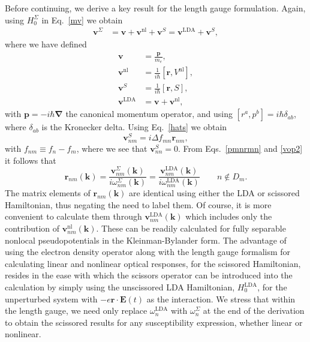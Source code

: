 \documentclass[floatfix,prb,aps,superscriptaddress,showpacs,11pt,preprint,letterpaper]{revtex4}
\begin{document}
Before continuing,
we derive a key result for the length gauge formulation. 
Again, using $H^\Sigma_0$ in
Eq.~\eqref{mv} we obtain
\begin{align}
\mathbf{v}^\Sigma&=
\mathbf{v} 
+
\mathbf{v}^\mathrm{nl} 
+\mathbf{v}^S
=
\mathbf{v}^\mathrm{LDA} 
+\mathbf{v}^S 
,
\label{vop2}
\end{align}
where we have defined 
\begin{align}
\mathbf{v} 
&=\frac{\mathbf{p}}{m_e},
\nonumber\\
\mathbf{v}^\mathrm{nl} 
&=
\frac{1}{i\hbar}[\mathbf{r},V^\mathrm{nl}],\label{vnl}
\\
\mathbf{v}^S
&=
\frac{1}{i\hbar}[\mathbf{r}, S],
\nonumber\\
\mathbf{v}^\mathrm{LDA} 
&=
\mathbf{v} 
+\mathbf{v}^\mathrm{nl}
,\nonumber
\end{align}  
with $\mathbf{p}=-i\hbar\boldsymbol{\nabla}$ the canonical momentum operator, 
and using $[r^a,p^b]=i\hbar\delta_{ab}$, where $\delta_{ab}$ is the Kronecker delta.
Using Eq.~\eqref{hats} we obtain 
\begin{equation}
\mathbf{v}^S_{nm}=i\Delta f_{mn}\mathbf{r}_{nm},
\label{chon.2} 
\end{equation}
with $f_{nm}\equiv f_n-f_m$,
where we see that $\mathbf{v}^S_{nn}=0$. From Eqs.~\eqref{pmnrmn} and
\eqref{vop2}
 it follows that
\begin{equation}
\mathbf{r}_{nm}(\mathbf{k}) 
=
\frac{\mathbf{v}^\Sigma_{nm}(\mathbf{k})}{i\omega^\Sigma_{nm}(\mathbf{k})}
=
\frac{\mathbf{v}^\mathrm{LDA}_{nm}(\mathbf{k})}{i\omega^\mathrm{LDA}_{nm}(\mathbf{k})}
\quad\quad n\notin D_m 
. 
\label{chon.10}
\end{equation}
The matrix elements 
of $\mathbf{r}_{nm}(\mathbf{k})$ are identical using either
the LDA or scissored
Hamiltonian, thus negating the need to label them.
Of course, it is more convenient to calculate them
through $\mathbf{v}^\mathrm{LDA}_{nm}(\mathbf{k})$ which 
includes only the contribution of 
$\mathbf{v}^\mathrm{nl}_{nm}(\mathbf{k})$. These can be readily
calculated
for 
fully separable nonlocal pseudopotentials in the 
Kleinman-Bylander 
form.\cite{olevanoPC,mottaCMS10,kleinmanPRL82,adolphPRB96}
The advantage of using the electron density operator along with 
the length gauge formalism for 
calculating linear and nonlinear optical responses,
for the scissored Hamiltonian,
resides in the ease with which the scissors operator
can be introduced into the calculation
by simply using the unscissored LDA Hamiltonian,
$H_0^{\mathrm{LDA}}$,
for the unperturbed system 
with $-e\mathbf{r}\cdot \mathbf{E}(t)$ as the interaction.
We stress that within the length gauge,
we need only replace $\omega^{\mathrm{LDA}}_{n}$ with 
$\omega_{n}^{\Sigma}$ at the end of the derivation
to obtain the scissored results for any 
susceptibility expression, whether linear or nonlinear.\cite{nastosPRB05} 
\end{document}
